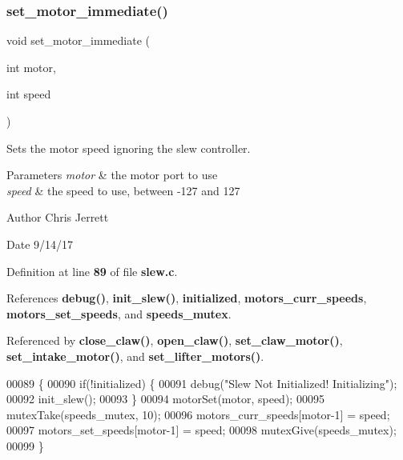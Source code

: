\subsubsection{set\+\_\+motor\+\_\+immediate()}
{\footnotesize\ttfamily void set\+\_\+motor\+\_\+immediate (\begin{DoxyParamCaption}\item[{int}]{motor,  }\item[{int}]{speed }\end{DoxyParamCaption})}



Sets the motor speed ignoring the slew controller. 


\begin{DoxyParams}{Parameters}
{\em motor} & the motor port to use \\
\hline
{\em speed} & the speed to use, between -\/127 and 127 \\
\hline
\end{DoxyParams}
\begin{DoxyAuthor}{Author}
Chris Jerrett 
\end{DoxyAuthor}
\begin{DoxyDate}{Date}
9/14/17 
\end{DoxyDate}


Definition at line \textbf{ 89} of file \textbf{ slew.\+c}.



References \textbf{ debug()}, \textbf{ init\+\_\+slew()}, \textbf{ initialized}, \textbf{ motors\+\_\+curr\+\_\+speeds}, \textbf{ motors\+\_\+set\+\_\+speeds}, and \textbf{ speeds\+\_\+mutex}.



Referenced by \textbf{ close\+\_\+claw()}, \textbf{ open\+\_\+claw()}, \textbf{ set\+\_\+claw\+\_\+motor()}, \textbf{ set\+\_\+intake\+\_\+motor()}, and \textbf{ set\+\_\+lifter\+\_\+motors()}.


\begin{DoxyCode}
00089                                                \{
00090   \textcolor{keywordflow}{if}(!initialized) \{
00091     debug(\textcolor{stringliteral}{"Slew Not Initialized! Initializing"});
00092     init_slew();
00093   \}
00094   motorSet(motor, speed);
00095   mutexTake(speeds_mutex, 10);
00096   motors_curr_speeds[motor-1] = speed;
00097   motors_set_speeds[motor-1] = speed;
00098   mutexGive(speeds_mutex);
00099 \}
\end{DoxyCode}
\mbox{\label{slew_8h_a7dff2b79dffe55fb936d977594d7c01d}} 

